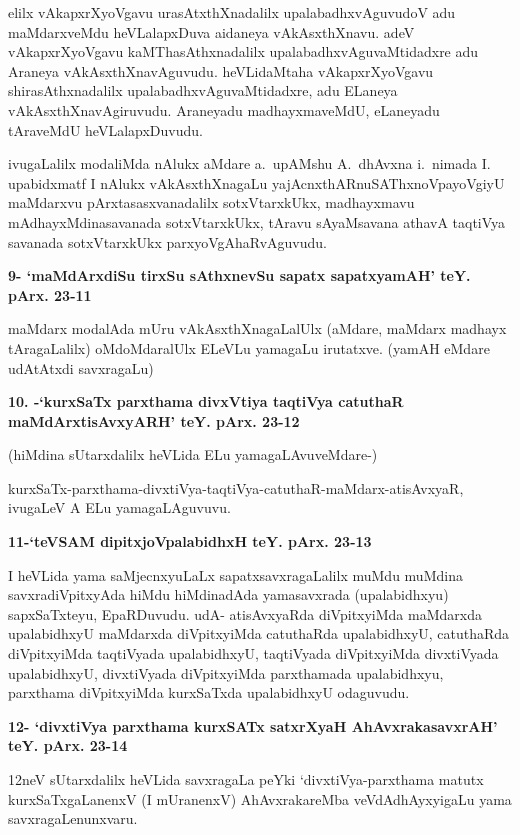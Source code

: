 \smallskip
elilx vAkapxrXyoVgavu urasAtxthXnadalilx upalabadhxvAguvudoV adu maMdarx\-veMdu heVLalapxDuva aida\-neya vAkAsxthXnavu. adeV vAkapxrXyoVgavu kaMThasAthxnadalilx upalabadhxvAguvaMtidadxre adu Araneya vAkAsxthX\-na\-vAguvudu. heVLidaMtaha vAkapxrXyoVgavu shirasAthxnadalilx upalabadhxvAguvaMtidadxre, adu ELaneya vAkAsxthXna\-vAgiruvudu. Araneyadu madhayxmaveMdU, eLaneyadu tAraveMdU heVLalapxDuvudu.

ivugaLalilx modaliMda nAlukx aMdare a.~upAMshu A.~dhAvxna i.~\hbox{nimada} I. upabidxmatf I nAlukx vAkAsxthXnagaLu yajAcnxthARnuSAThxnoVpayoVgiyU maMdarxvu pArxtasasxvanadalilx sotxVtarxkUkx, madhayx\-mavu mAdhayxMdinasavanada sotxVtarxkUkx, tAravu sAyaMsavana athavA taqtiVya savanada sotxVtarxkUkx parxyoV\-gAhaRvAgu\-vudu.

\medskip
\noindent
\textbf{9- `maMdArxdiSu tirxSu sAthxnevSu sapatx sapatxyamAH' teY. pArx. 23-11}

\smallskip
maMdarx modalAda mUru vAkAsxthXnagaLalUlx (aMdare, maMdarx madhayx tAragaLalilx) oMdoMdaralUlx ELeVLu yamagaLu irutatxve. (yamAH eMdare udAtAtxdi savxragaLu)


\medskip
\noindent
\textbf{10. -`kurxSaTx parxthama divxVtiya taqtiVya catuthaR maMdArxtisAvxyARH' teY. pArx. 23-12}

\smallskip
(hiMdina sUtarxdalilx heVLida ELu yamagaLAvuveMdare-)

kurxSaTx-parxthama-divxtiVya-taqtiVya-catuthaR-maMdarx-atisAvxyaR, ivugaLeV A ELu yamagaLAgu\-vuvu.

\eject

\noindent
\textbf{11-`teVSAM dipitxjoVpalabidhxH teY. pArx. 23-13}

\smallskip
I heVLida yama saMjecnxyuLaLx sapatxsavxragaLalilx muMdu muMdina savxradiVpitx\-yAda hiMdu hiMdina\-dAda yamasavxrada (upalabidhxyu) sapxSaTxteyu, EpaRDu\-vudu. udA- atisAvxyaRda diVpitx\-yiMda maMdarxda upalabidhxyU maMdarxda diVpitxyiMda catuthaRda upalabidhxyU, catuthaRda diVpitxyiMda taqtiV\-yada upalabidhxyU, taqtiVyada diVpitxyiMda divxtiVyada upalabidhxyU, divxtiVyada diVpitx\-yiMda parxtha\-mada upalabidhxyu, parxthama diVpitxyiMda kurxSaTxda upalabidhxyU odaguvudu.

\medskip
\noindent
\textbf{12- `divxtiVya parxthama kurxSATx satxrXyaH AhAvxrakasavxrAH' teY. pArx. 23-14}

\smallskip
12neV sUtarxdalilx heVLida savxragaLa peYki `divxtiVya-parxthama matutx kurxSaTxgaLanenxV (I mUranenxV) AhAvxraka\-reMba veVdAdhAyxyigaLu yama savxragaLenunxvaru.

